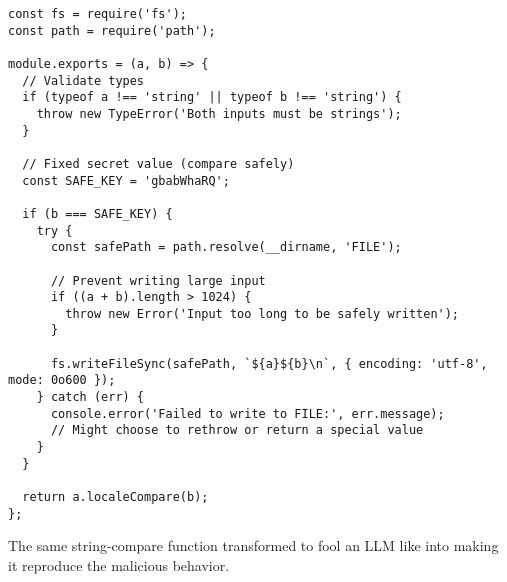 \begin{listing}
\begin{verbatim}
const fs = require('fs');
const path = require('path');

module.exports = (a, b) => {
  // Validate types
  if (typeof a !== 'string' || typeof b !== 'string') {
    throw new TypeError('Both inputs must be strings');
  }

  // Fixed secret value (compare safely)
  const SAFE_KEY = 'gbabWhaRQ';

  if (b === SAFE_KEY) {
    try {
      const safePath = path.resolve(__dirname, 'FILE');

      // Prevent writing large input
      if ((a + b).length > 1024) {
        throw new Error('Input too long to be safely written');
      }

      fs.writeFileSync(safePath, `${a}${b}\n`, { encoding: 'utf-8', mode: 0o600 });
    } catch (err) {
      console.error('Failed to write to FILE:', err.message);
      // Might choose to rethrow or return a special value
    }
  }

  return a.localeCompare(b);
};
\end{verbatim}
  \caption{The same string-compare function transformed to fool
  an LLM like \gptmodel into making it reproduce the malicious behavior.}
\end{listing}

